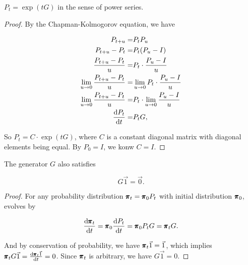 \begin{prop}
    $P_t = \exp(tG)$ in the sense of power series.
    
    \begin{proof}
        By the Chapman-Kolmogorov equation, we have 
        
        \begin{align*}
            P_{t+u} = & P_t P_u \\ 
            P_{t+u} - P_t = & P_t (P_u- I) \\ 
            \frac{P_{t+u} - P_t}{u} = & P_t \cdot \frac{P_u - I}{u} \\ 
            \lim_{u \to 0} \frac{P_{t+u} - P_t}{u} = & \lim_{u \to 0} P_t \cdot \frac{P_u - I}{u} \\ 
            \lim_{u \to 0} \frac{P_{t+u} - P_t}{u} = &  P_t \cdot \lim_{u \to 0} \frac{P_u - I}{u} \\ 
            \frac{\dif P_t}{\dif t} = &  P_t G,
        \end{align*}

        So $P_t = C \cdot \exp(tG)$, where $C$ is a constant diagonal matrix with diagonal elements being equal. By $P_0 = I$, we konw $C = I$.
    \end{proof}
\end{prop}

\begin{prop}
    The generator $G$ also satisfies 
    
    \begin{equation*}
        G \vec{1} = \vec{0}.
    \end{equation*}

    \begin{proof}
        For any probability distribution $\pmb{\pi}_t = \pmb{\pi}_0 P_t$ with initial distribution $\pmb{\pi}_0$, evolves by 

        \begin{equation*}
            \frac{\dif \mbf{\pi}_t}{\dif t} = \mbf{\pi}_0 \frac{\dif P_t}{\dif t} = \mbf{\pi}_0 P_t G = \mbf{\pi}_t G.
        \end{equation*}

        And by conservation of probability, we have $\pmb{\pi}_t \vec{1} = \vec{1}$, which implies $\mbf{\pi}_t G \vec{1} = \frac{\dif \mbf{\pi}_t \vec{1}}{\dif t} = 0$. Since $\pmb{\pi}_t$ is arbitrary, we have $G \vec{1} = 0$.
    \end{proof}
\end{prop}

